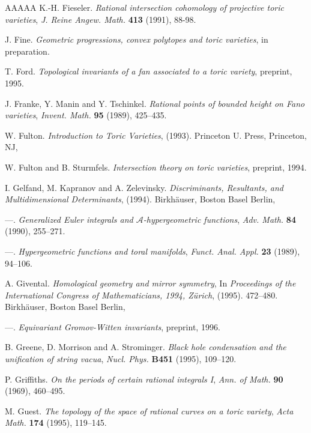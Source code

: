 \documentclass{amsart}
\theoremstyle{plain}
\theoremstyle{definition}
\begin{document}
\begin{thebibliography}{AAAAA}
K.-H. Fieseler. \textit{Rational intersection cohomology of projective toric varieties}, \textit{J. Reine Angew. Math.} \textbf{413} (1991), 88-98.

J. Fine. \textit{Geometric progressions, convex polytopes and toric varieties}, in preparation.

T. Ford. \textit{Topological invariants of a fan associated to a toric variety}, preprint, 1995.

J. Franke, Y. Manin and Y. Tschinkel. \textit{Rational points of bounded height on Fano varieties}, \textit{Invent. Math.} \textbf{95} (1989), 425--435.

W. Fulton. \textit{Introduction to Toric Varieties}, (1993). Princeton U. Press, Princeton, NJ,

W. Fulton and B. Sturmfels. \textit{Intersection theory on toric varieties}, preprint, 1994.

I. Gelfand, M. Kapranov and A. Zelevinsky. \textit{Discriminants, Resultants, and Multidimensional Determinants}, (1994). Birkh\"auser, Boston Basel Berlin,

---. \textit{Generalized Euler integrals and $\mathcal{A}$-hypergeometric functions}, \textit{Adv. Math.} \textbf{84} (1990), 255--271.

---. \textit{Hypergeometric functions and toral manifolds}, \textit{Funct. Anal. Appl.} \textbf{23} (1989), 94--106.

A. Givental. \textit{Homological geometry and mirror symmetry}, In \textit{Proceedings of the International Congress of Mathematicians, 1994, Z\"urich}, (1995). 472--480. Birkh\"auser, Boston Basel Berlin,

---. \textit{Equivariant Gromov-Witten invariants}, preprint, 1996.

B. Greene, D. Morrison and A. Strominger. \textit{Black hole condensation and the unification of string vacua}, \textit{Nucl. Phys.} \textbf{B451} (1995), 109--120.

P. Griffiths. \textit{On the periods of certain rational integrals I}, \textit{Ann. of Math.} \textbf{90} (1969), 460--495.

M. Guest. \textit{The topology of the space of rational curves on a toric variety}, \textit{Acta Math.} \textbf{174} (1995), 119--145.


\end{thebibliography}
\end{document}
